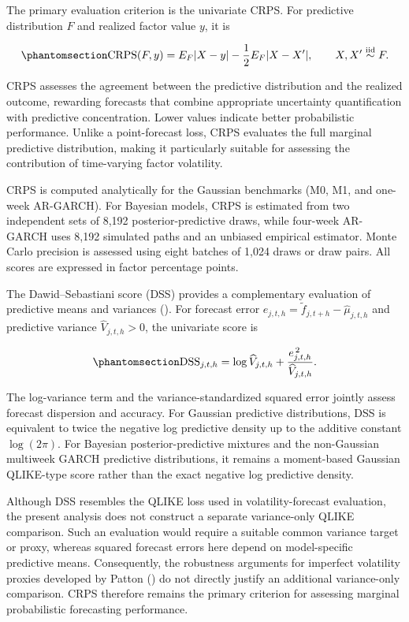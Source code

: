 \documentclass[
  12pt,
  letterpaper,
  DIV=11,
  numbers=noendperiod]{scrreprt}
\begin{document}
The primary evaluation criterion is the univariate CRPS. For predictive
distribution \(F\) and realized factor value \(y\), it is

\begin{equation}\protect\phantomsection\label{eq-crps}{
\operatorname{CRPS}(F,y)=
E_F|X-y|-\frac12E_F|X-X'|,
\qquad X,X'\stackrel{\mathrm{iid}}{\sim}F.
}\end{equation}

CRPS assesses the agreement between the predictive distribution and the
realized outcome, rewarding forecasts that combine appropriate
uncertainty quantification with predictive concentration. Lower values
indicate better probabilistic performance. Unlike a point-forecast loss,
CRPS evaluates the full marginal predictive distribution, making it
particularly suitable for assessing the contribution of time-varying
factor volatility.

CRPS is computed analytically for the Gaussian benchmarks (M0, M1, and
one-week AR-GARCH). For Bayesian models, CRPS is estimated from two
independent sets of 8,192 posterior-predictive draws, while four-week
AR-GARCH uses 8,192 simulated paths and an unbiased empirical estimator.
Monte Carlo precision is assessed using eight batches of 1,024 draws or
draw pairs. All scores are expressed in factor percentage points.

The Dawid--Sebastiani score (DSS) provides a complementary evaluation of
predictive means and variances (). For forecast error
\(e_{j,t,h}=\tilde f_{j,t+h}-\widehat\mu_{j,t,h}\) and predictive
variance \(\widehat V_{j,t,h}>0\), the univariate score is

\begin{equation}\protect\phantomsection\label{eq-dss}{
\operatorname{DSS}_{j,t,h}
=\log \widehat V_{j,t,h}
+\frac{e_{j,t,h}^{\,2}}{\widehat V_{j,t,h}}.
}\end{equation}

The log-variance term and the variance-standardized squared error
jointly assess forecast dispersion and accuracy. For Gaussian predictive
distributions, DSS is equivalent to twice the negative log predictive
density up to the additive constant \(\log(2\pi)\). For Bayesian
posterior-predictive mixtures and the non-Gaussian multiweek GARCH
predictive distributions, it remains a moment-based Gaussian QLIKE-type
score rather than the exact negative log predictive density.

Although DSS resembles the QLIKE loss used in volatility-forecast
evaluation, the present analysis does not construct a separate
variance-only QLIKE comparison. Such an evaluation would require a
suitable common variance target or proxy, whereas squared forecast
errors here depend on model-specific predictive means. Consequently, the
robustness arguments for imperfect volatility proxies developed by
Patton () do not directly
justify an additional variance-only comparison. CRPS therefore remains
the primary criterion for assessing marginal probabilistic forecasting
performance.
\end{document}
